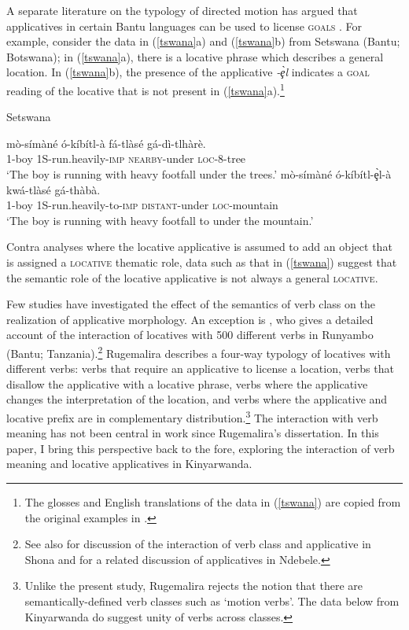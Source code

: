 \documentclass[output=paper]{langsci/langscibook}
\begin{document}
A separate literature on the typology of directed motion has argued that applicatives in certain Bantu languages can be used to license {\scshape goals} \citep{schaefer:1985,sitoe:1996}. For example, consider the data in (\ref{tswana}a) and (\ref{tswana}b) from Setswana (Bantu; Botswana); in (\ref{tswana}a), there is a locative phrase which describes a general location. In (\ref{tswana}b), the presence of the applicative \emph{-\c{è}l} indicates a {\scshape goal}  reading of the locative that is not present in (\ref{tswana}a).\footnote{The glosses and English translations of the data in (\ref{tswana}) are copied from the original examples in \citet{schaefer:1985}.}
\begin{exe}
	\ex\label{tswana}Setswana\begin{xlist}
		\ex  \gll mò-símàné ó-kíbítl-à fá-tlàsé gá-dì-tlhàrè.\\
			1-boy 1S-run.heavily-{\scshape imp} {\scshape nearby-}under {\scshape loc-8-}tree\\
			\glt `The boy is running with heavy footfall under the trees.'
		\ex\gll mò-símàné ó-kíbítl-\c{è}l-à kwá-tlàsé gá-thàbà.\\
			1-boy 1S-run.heavily-to-{\scshape imp} {\scshape distant}-under {\scshape loc-}mountain\\
			\glt `The boy is running with heavy footfall to under the mountain.'  \citep[Tables VI-VII]{Schaefer1985}
	\end{xlist}
\end{exe}
%
Contra analyses where the locative applicative is assumed to add an object that is assigned a {\scshape locative} thematic role, data such as that in (\ref{tswana}) suggest that the semantic role of the locative applicative is not always a general {\scshape locative}.

Few studies have investigated the effect of the semantics of verb class on the realization of applicative morphology. An exception is \citet{rugemalira:1993}, who gives a detailed account of the interaction of locatives with 500 different verbs in Runyambo (Bantu; Tanzania).\footnote{See also \citet{cannmabugu:2006} for discussion of the interaction of verb class and applicative in Shona and \citet{sibanda:2016} for a related discussion of applicatives in Ndebele.} Rugemalira describes a four-way typology of locatives with different verbs: verbs that require an applicative to license a location, verbs that disallow the applicative with a locative phrase, verbs where the applicative changes the interpretation of the location, and verbs where the applicative and locative prefix are in complementary distribution.\footnote{Unlike the present study, Rugemalira rejects the notion that there are semantically-defined verb classes such as `motion verbs'. The data below from Kinyarwanda do suggest unity of verbs across classes.}
The interaction with verb meaning has not been central in work since Rugemalira's dissertation. In this paper, I bring this perspective back to the fore, exploring the interaction of verb meaning and locative applicatives in Kinyarwanda.
\end{document}
